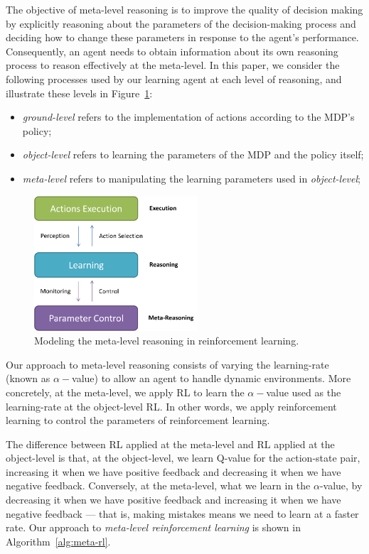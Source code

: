 The objective of meta-level reasoning is to improve the quality of decision making by explicitly reasoning about the parameters of the decision-making process and deciding how to change these parameters in response to the agent's performance. 
Consequently, an agent needs to obtain information about its own reasoning process to reason effectively at the meta-level. 
In this paper, we consider the following processes used by our learning agent at each level of reasoning, and illustrate these levels in Figure~\ref{fig:reasoningOnRL}:

\begin{itemize}
\item \textit{ground-level} refers to the implementation of actions according to the MDP's policy;
\item \textit{object-level} refers to learning the parameters of the MDP and the policy itself;
\item \textit{meta-level} refers to manipulating the learning parameters used in \textit{object-level};
\end{itemize}

\begin{figure}[ht]
\centering
\includegraphics[width=230px]{images/reasoningOnRL}
\caption{Modeling the meta-level reasoning in reinforcement learning.}
\label{fig:reasoningOnRL}
\end{figure}

Our approach to meta-level reasoning consists of varying the learning-rate (known as $\alpha-$value)
to allow an agent to handle dynamic environments. 
More concretely, at the meta-level, we apply RL to learn the $\alpha-$value used as the learning-rate at the object-level RL. 
In other words, we apply reinforcement learning to control the parameters of reinforcement learning. 

The difference between RL applied at the meta-level and RL applied at the object-level is that, at the object-level, we learn Q-value for the action-state pair, increasing it when we have positive feedback and decreasing it when we have negative feedback. 
Conversely, at the meta-level, what we learn in the $\alpha$-value, by decreasing it when we have positive feedback and increasing it when we have negative feedback --- that is, making mistakes means we need to learn at a faster rate. 
Our approach to \textit{meta-level reinforcement learning} is shown in Algorithm~\ref{alg:meta-rl}. 

